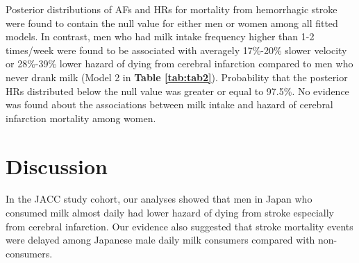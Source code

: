 \documentclass[nutrients,article,submitted,moreauthors,pdftex]{mdpi}
\begin{document}
Posterior distributions of AFs and HRs for mortality from hemorrhagic
stroke were found to contain the null value for either men or women
among all fitted models. In contrast, men who had milk intake frequency
higher than 1-2 times/week were found to be associated with averagely
17\%-20\% slower velocity or 28\%-39\% lower hazard of dying from
cerebral infarction compared to men who never drank milk (Model 2 in
\textbf{Table \ref{tab:tab2}}). Probability that the posterior HRs
distributed below the null value was greater or equal to 97.5\%. No
evidence was found about the associations between milk intake and hazard
of cerebral infarction mortality among women.

\hypertarget{discussion}{%
\section{Discussion}\label{discussion}}

In the JACC study cohort, our analyses showed that men in Japan who
consumed milk almost daily had lower hazard of dying from stroke
especially from cerebral infarction. Our evidence also suggested that
stroke mortality events were delayed among Japanese male daily milk
consumers compared with non-consumers.
\end{document}
